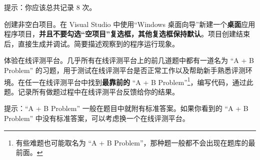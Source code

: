 \begin{problemset}
\begin{enumerate}
		提示：你应该总共记录 8 次。
	\end{enumerate}

	\item 创建非空白项目。在 Visual Studio 中使用“Windows 桌面向导”新建一个\textbf{桌面}应用程序项目，\textbf{并且不要勾选“空项目”复选框，其他复选框保持默认}。项目创建结束后，直接生成并调试。简要描述观察到的程序运行现象。

	\item 体验在线评测平台。几乎所有在线评测平台上的前几道题中都有一道名为 “A + B Problem” 的习题，用于测试在线评测平台是否正常工作以及帮助新手熟悉评测环境。在任一在线评测平台中找到\textbf{最靠前的} “A + B Problem”\footnote{有些难题也可能取名为 “A + B Problem”，那种题一般都不会出现在题库的最前面。}，编写代码，通过此题。记录所有做题过程中在线评测平台反馈给你的结果。

	提示：“A + B Problem” 一般在题目中就附有标准答案。如果你看到的 “A + B Problem” 中没有标准答案，可以考虑换一个在线评测平台。
\end{problemset}